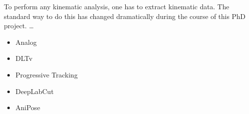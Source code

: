 To perform any kinematic analysis, one has to extract kinematic data.
The standard way to do this has changed dramatically during the course of this PhD project.
\ldots{}

\begin{itemize}
\item Analog \citep{Bernstein1927b}
\item DLTv \citep{Hedrick2008}
\item Progressive Tracking \citep{MMielke2020}
\item DeepLabCut \citep{Mathis2018,Mathis2020}
\item AniPose \citep{Karashchuk2021}
\end{itemize}
